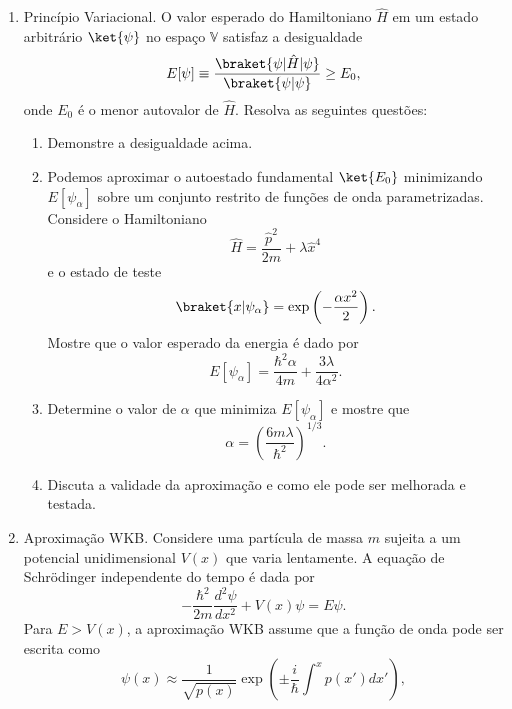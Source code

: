 \begin{enumerate}
\begin{enumerate}
		            restantes devem ter spin total menor que $j_1 + j_2$.
		      \item Utilizando os resultados anteriores, mostre que
		            $$
			            \mathbb{V} = \mathbb{V}_{j_1+j_2} \oplus \dots \oplus \mathbb{V}_{|j_1-j_2|}
		            $$
		            e verifique que a soma das dimensões dos subespaços resulta em
		            $(2j_1+1)(2j_2+1)$.
	      \end{enumerate}
	\item Princípio Variacional. O valor esperado do Hamiltoniano $\hat{H}$ em um estado
	      arbitrário $\ket{\psi}$ no espaço $\mathbb{V}$ satisfaz a desigualdade
	      $$
		      E[\psi] \equiv \frac{\braket{\psi|\hat{H}|\psi}}{\braket{\psi|\psi}} \geq E_0,
	      $$
	      onde $E_0$ é o menor autovalor de $\hat{H}$. Resolva as seguintes questões:
	      \begin{enumerate}
		      \item Demonstre a desigualdade acima.
		      \item Podemos aproximar o autoestado fundamental $\ket{E_0}$ minimizando
		            $E[\psi_\alpha]$ sobre um conjunto restrito de funções de onda
		            parametrizadas. Considere o Hamiltoniano
		            $$
			            \hat{H} = \frac{\hat{p}^2}{2m} + \lambda \hat{x}^4
		            $$
		            e o estado de teste
		            $$
			            \braket{x|\psi_\alpha} = \exp\left(-\frac{\alpha x^2}{2}\right).
		            $$
		            Mostre que o valor esperado da energia é dado por
		            $$
			            E[\psi_\alpha] = \frac{\hbar^2\alpha}{4m} + \frac{3\lambda}{4\alpha^2}.
		            $$
		      \item Determine o valor de $\alpha$ que minimiza $E[\psi_\alpha]$ e mostre
		            que
		            $$
			            \alpha = \left(\frac{6m\lambda}{\hbar^2}\right)^{1/3}.
		            $$
		      \item Discuta a validade da aproximação e como ele pode ser melhorada e
		            testada.
	      \end{enumerate}
	\item Aproximação WKB. Considere uma partícula de massa $m$ sujeita a um potencial
	      unidimensional $V(x)$ que varia lentamente. A equação de Schrödinger
	      independente do tempo é dada por
	      $$
		      -\frac{\hbar^2}{2m} \frac{d^2\psi}{dx^2} + V(x) \psi = E \psi.
	      $$
	      Para $E > V(x)$, a aproximação WKB assume que a função de onda pode ser
	      escrita como
	      $$
		      \psi(x) \approx \frac{1}{\sqrt{p(x)}} \exp\left(\pm \frac{i}{\hbar} \int^x p(x') dx' \right),
$$
\end{enumerate}
